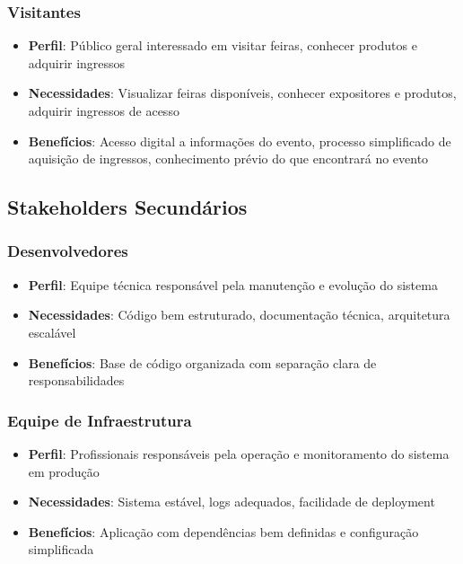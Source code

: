 \documentclass[12pt,a4paper]{article}
\begin{document}
\subsubsection{Visitantes}
\begin{itemize}
    \item \textbf{Perfil}: Público geral interessado em visitar feiras, conhecer produtos e adquirir ingressos
    \item \textbf{Necessidades}: Visualizar feiras disponíveis, conhecer expositores e produtos, adquirir ingressos de acesso
    \item \textbf{Benefícios}: Acesso digital a informações do evento, processo simplificado de aquisição de ingressos, conhecimento prévio do que encontrará no evento
\end{itemize}

\subsection{Stakeholders Secundários}

\subsubsection{Desenvolvedores}
\begin{itemize}
    \item \textbf{Perfil}: Equipe técnica responsável pela manutenção e evolução do sistema
    \item \textbf{Necessidades}: Código bem estruturado, documentação técnica, arquitetura escalável
    \item \textbf{Benefícios}: Base de código organizada com separação clara de responsabilidades
\end{itemize}

\subsubsection{Equipe de Infraestrutura}
\begin{itemize}
    \item \textbf{Perfil}: Profissionais responsáveis pela operação e monitoramento do sistema em produção
    \item \textbf{Necessidades}: Sistema estável, logs adequados, facilidade de deployment
    \item \textbf{Benefícios}: Aplicação com dependências bem definidas e configuração simplificada
\end{itemize}
\end{document}
